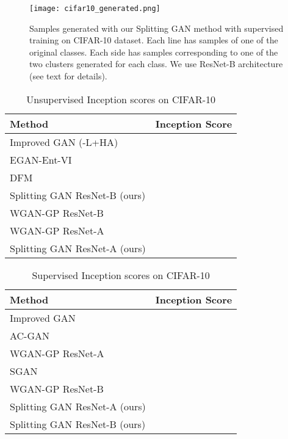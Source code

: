 \documentclass[times,twocolumn]{article}
\begin{document}
\begin{figure*}
\centering
\texttt{[image: cifar10\_generated.png]}
\caption{Samples generated with our Splitting GAN method with supervised training on CIFAR-10 dataset. Each line has samples of one of the original classes. Each side has samples corresponding to one of the two clusters generated for each class. We use ResNet-B architecture (see text for details).}
\label{fig:cifar10_generated}
\end{figure*}

\begin{table}
\begin{center}
\caption{Unsupervised Inception scores on CIFAR-10}
\begin{tabular}{lc}
\toprule
Method                                    &   Inception Score \\
\midrule
Improved GAN (-L+HA) \cite{Salimans2016} &    \\
EGAN-Ent-VI \cite{Dai2017}               &    \\
DFM \cite{WardeFarley2017}               &    \\
Splitting GAN ResNet-B (ours)              &    \\
WGAN-GP ResNet-B                         &    \\
WGAN-GP ResNet-A \cite{Gulrajani2017}    &    \\
Splitting GAN ResNet-A (ours)              &    \\
\bottomrule
\end{tabular}
\end{center}
\label{tab:unsup}
\end{table}

\begin{table}
\begin{center}
\caption{Supervised Inception scores on CIFAR-10}
\begin{tabular}{lc}
\toprule
Method                                 &    Inception Score \\
\midrule
Improved GAN \cite{Salimans2016}      &     \\
AC-GAN \cite{Odena2017}               &     \\
WGAN-GP ResNet-A \cite{Gulrajani2017} &     \\
SGAN \cite{Huang2016}                 &     \\
WGAN-GP ResNet-B                      &     \\
Splitting GAN ResNet-A (ours)           &     \\
Splitting GAN ResNet-B (ours)           &     \\
\bottomrule
\end{tabular}
\end{center}
\label{tab:sup}
\end{table}
\end{document}
